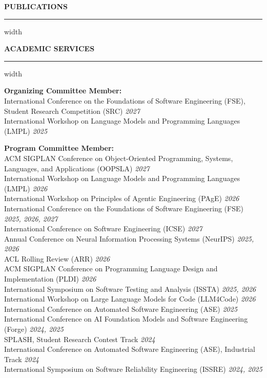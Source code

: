 \documentclass[centered]{resume}
\newlength{\cvsectiongap}
\newenvironment{rSection}[1]{%
  \par\Needspace{5\baselineskip}\addvspace{\cvsectiongap}
  {\bfseries \MakeUppercase{#1}}\vspace{0.65em}%
  \noindent\hrule width \linewidth\vspace{-0.45em}\par
}{\par}
\begin{document}
\begin{resume}
\begin{rSection}{Publications}
\end{rSection}



\begin{rSection}{Academic Services}




\textbf{Organizing Committee Member:} \\
{International Conference on the Foundations of Software Engineering (FSE), Student Research Competition (SRC)} \hfill {\em 2027} \\
{International Workshop on Language Models and Programming Languages (LMPL)} \hfill {\em 2025} 

\textbf{Program Committee Member:} \\
{ACM SIGPLAN Conference on Object-Oriented Programming, Systems, Languages, and Applications (OOPSLA)} \hfill {\em 2027} \\
{International Workshop on Language Models and Programming Languages (LMPL)} \hfill {\em 2026} \\
{International Workshop on Principles of Agentic Engineering (PAgE)} \hfill {\em 2026} \\
{International Conference on the Foundations of Software Engineering (FSE)} \hfill {\em 2025, 2026, 2027} \\
{International Conference on Software Engineering (ICSE)} \hfill {\em 2027} \\
{Annual Conference on Neural Information Processing Systems (NeurIPS)} \hfill {\em 2025, 2026} \\
{ACL Rolling Review (ARR)} \hfill {\em 2026} \\
{ACM SIGPLAN Conference on Programming Language Design and Implementation (PLDI)} \hfill {\em 2026} \\
{International Symposium on Software Testing and Analysis (ISSTA)} \hfill {\em 2025, 2026} \\
{International Workshop on Large Language Models for Code (LLM4Code)} \hfill {\em 2026} \\
{International Conference on Automated Software Engineering (ASE)} \hfill {\em 2025} \\
{International Conference on AI Foundation Models and Software Engineering (Forge)} \hfill {\em 2024, 2025} \\
{SPLASH, Student Research Contest Track} \hfill {\em 2024} \\
{International Conference on Automated Software Engineering (ASE), Industrial Track} \hfill {\em 2024} \\
{International Symposium on Software Reliability Engineering (ISSRE)} \hfill {\em 2024, 2025}


\end{rSection}
\end{resume}
\end{document}
